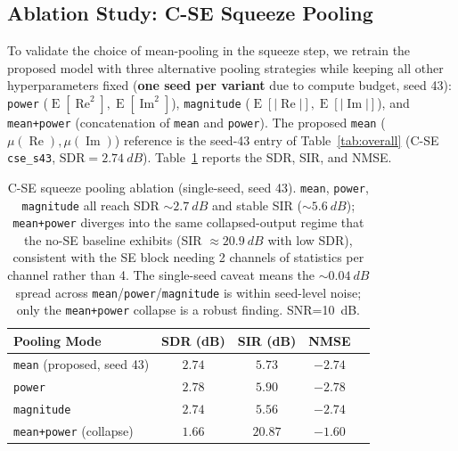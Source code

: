 \documentclass[twocolumn,english]{svjour3}
\begin{document}
\subsection{Ablation Study: C-SE Squeeze Pooling}

To validate the choice of mean-pooling in the squeeze step, we retrain the proposed model with three alternative pooling strategies while keeping all other hyperparameters fixed (\textbf{one seed per variant} due to compute budget, seed 43): \texttt{power} ($\operatorname{E}[\operatorname{Re}^2], \operatorname{E}[\operatorname{Im}^2]$), \texttt{magnitude} ($\operatorname{E}[|\operatorname{Re}|], \operatorname{E}[|\operatorname{Im}|]$), and \texttt{mean+power} (concatenation of \texttt{mean} and \texttt{power}). The proposed \texttt{mean} ($\mu(\operatorname{Re}), \mu(\operatorname{Im})$) reference is the seed-43 entry of Table~\ref{tab:overall} (C-SE \texttt{cse\_s43}, $\text{SDR}=\SI{2.74}{dB}$). Table~\ref{tab:se_pooling_mode} reports the SDR, SIR, and NMSE.

\begin{table}[t]
    \centering
    \small
    \caption{C-SE squeeze pooling ablation (single-seed, seed 43). \texttt{mean}, \texttt{power}, \texttt{magnitude} all reach SDR $\sim\SI{2.7}{dB}$ and stable SIR ($\sim\SI{5.6}{dB}$); \texttt{mean+power} diverges into the same collapsed-output regime that the no-SE baseline exhibits (SIR $\approx\SI{20.9}{dB}$ with low SDR), consistent with the SE block needing 2 channels of statistics per channel rather than 4. The single-seed caveat means the $\sim\SI{0.04}{dB}$ spread across \texttt{mean}/\texttt{power}/\texttt{magnitude} is within seed-level noise; only the \texttt{mean+power} collapse is a robust finding. SNR=\SI{10}{dB}.}
    \label{tab:se_pooling_mode}
    \setlength{\tabcolsep}{4.5pt}%
    \begin{tabular}{lcccc}
        \toprule
        Pooling Mode & SDR (dB) & SIR (dB) & NMSE \\
        \midrule
        \texttt{mean} (proposed, seed 43)        & $\mathbf{2.74}$ & $5.73$ & $-2.74$ \\
        \texttt{power}                           & $2.78$         & $5.90$ & $-2.78$ \\
        \texttt{magnitude}                       & $2.74$         & $5.56$ & $-2.74$ \\
        \texttt{mean+power} (collapse)           & $1.66$         & $20.87$ & $-1.60$ \\
        \bottomrule
    \end{tabular}
\end{table}
\end{document}

